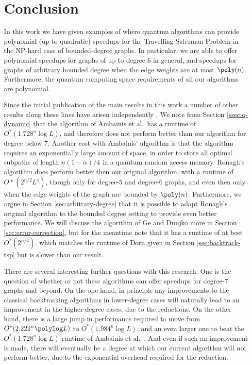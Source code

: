 \section{Conclusion}

In this work we have given examples of where quantum algorithms can provide polynomial (up to quadratic) speedups for the Travelling Salesman Problem in the NP-hard case of bounded-degree graphs. In particular, we are able to offer polynomial speedups for graphs of up to degree 6 in general, and speedups for graphs of arbitrary bounded degree when the edge weights are at most $\poly(n)$. Furthermore, the quantum computing space requirements of all our algorithms are polynomial.

Since the initial publication of the main results in this work a number of other results along these lines have arisen independently \cite{ambainis2018, ronagh2019, ge2019}. We note from Section \ref{ssec:q-dynamic} that the algorithm of Ambainis et al.\ has a runtime of $O^*(1.728^n\log L)$, and therefore does not perform better than our algorithm for degree below 7. Another cost with Ambainis' algorithm is that the algorithm requires an exponentially large amount of space, in order to store all optimal subpaths of length $n(1-\alpha)/4$ in a quantum random access memory. Ronagh's algorithm does perform better then our original algorithm, with a runtime of $O*(2^{n/2}L^4)$, though only for degree-5 and degree-6 graphs, and even then only when the edge weights of the graph are bounded by $\poly(n)$. Furthermore, we argue in Section \ref{sec:arbitrary-degree} that it is possible to adapt Ronagh's original algorithm to the bounded degree setting to provide even better performance. We will discuss the algorithm of Ge and Dunjko more in Section \ref{sec:error-correction}, but for the meantime note that it has a runtime of at best $O^*(2^{n/4})$, which matches the runtime of D\"{o}rn \cite{dorn2007} given in Section \ref{sec:backtrack-tsp} but is slower than our result.

There are several interesting further questions with this research. One is the question of whether or not these algorithms can offer speedups for degree-7 graphs and beyond. On the one hand, in principle any improvements to the classical backtracking algorithms in lower-degree cases will naturally lead to an improvement in the higher-degree cases, due to the reductions. On the other hand, there is a large jump in performance required to move from $O^*(2.222^n\polylog L)$ to $O^*(1.984^n\log L)$, and an even larger one to beat the $O^*(1.728^n\log L)$ runtime of Ambainis et al.~\cite{ambainis2018}. And even if such an improvement is made, there will eventually be a degree at which our current algorithm will not perform better, due to the exponential overhead required for the reduction.

